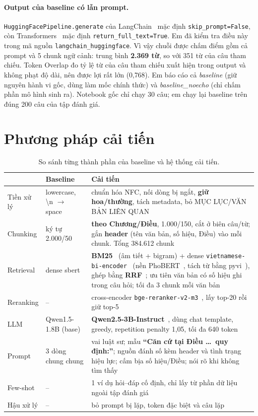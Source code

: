 \documentclass[11pt,a4paper]{article}
\begin{document}
\paragraph{Output của baseline có lẫn prompt.}
\texttt{HuggingFacePipeline.generate} của LangChain~\cite{langchain} mặc định \texttt{skip\_prompt=False}, còn Transformers~\cite{wolf2020transformers} mặc định \texttt{return\_full\_text=True}.
Em đã kiểm tra điều này trong mã nguồn \texttt{langchain\_huggingface}.
Vì vậy chuỗi được chấm điểm gồm cả prompt và 5 chunk ngữ cảnh: trung bình \textbf{2.369 từ}, so với 351 từ của câu tham chiếu.
Token Overlap đo tỷ lệ từ của câu tham chiếu xuất hiện trong output và không phạt độ dài, nên được lợi rất lớn (0{,}768).
Em báo cáo cả \emph{baseline} (giữ nguyên hành vi gốc, dùng làm mốc chính thức) và \emph{baseline\_noecho} (chỉ chấm phần mô hình sinh ra).
Notebook gốc chỉ chạy 30 câu; em chạy lại baseline trên đúng 200 câu của tập đánh giá.

\section{Phương pháp cải tiến}
\begin{table}[H]
\centering\small
\caption{So sánh từng thành phần của baseline và hệ thống cải tiến.}
\begin{tabularx}{\linewidth}{@{}l>{\raggedright}p{2.6cm}X@{}}
\toprule
& \textbf{Baseline} & \textbf{Cải tiến} \\
\midrule
Tiền xử lý & lowercase, \textbackslash n $\rightarrow$ space & chuẩn hóa NFC, nối dòng bị ngắt, \textbf{giữ hoa/thường}, tách metadata, bỏ MỤC LỤC/VĂN BẢN LIÊN QUAN \\
Chunking & ký tự 2.000/50 & \textbf{theo Chương/Điều}, 1.000/150, cắt ở biên câu/từ; gắn \textbf{header} (tên văn bản, số hiệu, Điều) vào mỗi chunk. Tổng 384.612 chunk \\
Retrieval & dense sbert & \textbf{BM25}~\cite{robertson2009bm25} (âm tiết + bigram) + dense \texttt{vietnamese-bi-encoder}~\cite{bkaibiencoder,duc2024vietrag} (nền PhoBERT~\cite{nguyen2020phobert}, tách từ bằng pyvi~\cite{pyvi}), ghép bằng \textbf{RRF}~\cite{cormack2009rrf}; ưu tiên văn bản có số hiệu ghi trong câu hỏi; tối đa 3 chunk mỗi văn bản \\
Reranking & -- & cross-encoder \texttt{bge-reranker-v2-m3}~\cite{bgereranker,chen2024m3}, lấy top-20 rồi giữ top-5 \\
LLM & Qwen1.5-1.8B (base) & \textbf{Qwen2.5-3B-Instruct}~\cite{qwen25}, dùng chat template, greedy, repetition penalty 1{,}05, tối đa 640 token \\
Prompt & 3 dòng chung chung & vai luật sư; mẫu \textbf{``Căn cứ tại Điều \dots\ quy định:''}; nguồn đánh số kèm header và tình trạng hiệu lực; cấm bịa số hiệu/Điều; nói rõ khi không tìm thấy \\
Few-shot & -- & 1 ví dụ hỏi--đáp cố định, chỉ lấy từ phần dữ liệu ngoài tập đánh giá \\
Hậu xử lý & -- & bỏ prompt bị lặp, token đặc biệt và câu lặp \\
\bottomrule
\end{tabularx}
\end{table}
\end{document}
